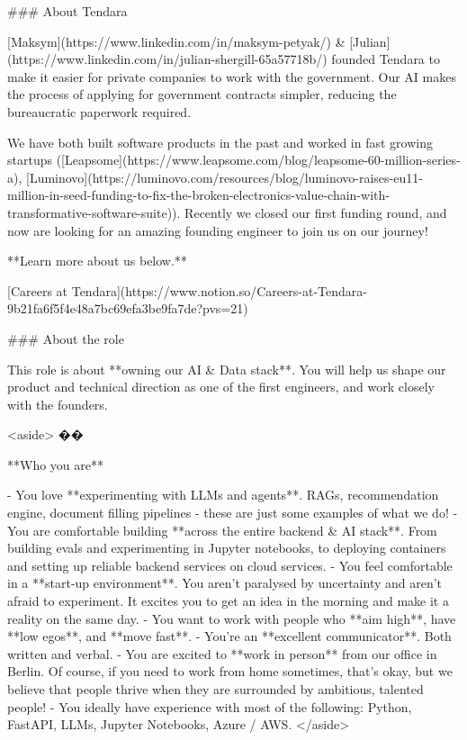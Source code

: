 ### About Tendara

[Maksym](https://www.linkedin.com/in/maksym-petyak/) & [Julian](https://www.linkedin.com/in/julian-shergill-65a57718b/) founded Tendara to make it easier for private companies to work with the government. Our AI makes the process of applying for government contracts simpler, reducing the bureaucratic paperwork required.

We have both built software products in the past and worked in fast growing startups ([Leapsome](https://www.leapsome.com/blog/leapsome-60-million-series-a), [Luminovo](https://luminovo.com/resources/blog/luminovo-raises-eu11-million-in-seed-funding-to-fix-the-broken-electronics-value-chain-with-transformative-software-suite)). Recently we closed our first funding round, and now are looking for an amazing founding engineer to join us on our journey!

**Learn more about us below.**

[Careers at Tendara](https://www.notion.so/Careers-at-Tendara-9b21fa6f5f4e48a7bc69efa3be9fa7de?pvs=21)

### About the role

This role is about **owning our AI & Data stack**. You will help us shape our product and technical direction as one of the first engineers, and work closely with the founders. 

<aside>
��️

**Who you are**

- You love **experimenting with LLMs and agents**. RAGs, recommendation engine, document filling pipelines - these are just some examples of what we do!
- You are comfortable building **across the entire backend & AI stack**. From building evals and experimenting in Jupyter notebooks, to deploying containers and setting up reliable backend services on cloud services.
- You feel comfortable in a **start-up environment**. You aren’t paralysed by uncertainty and aren’t afraid to experiment. It excites you to get an idea in the morning and make it a reality on the same day.
- You want to work with people who **aim high**, have **low egos**, and **move fast**.
- You’re an **excellent communicator**. Both written and verbal.
- You are excited to **work in person** from our office in Berlin. Of course, if you need to work from home sometimes, that’s okay, but we believe that people thrive when they are surrounded by ambitious, talented people!
- You ideally have experience with most of the following: Python, FastAPI, LLMs, Jupyter Notebooks, Azure / AWS.
</aside>

